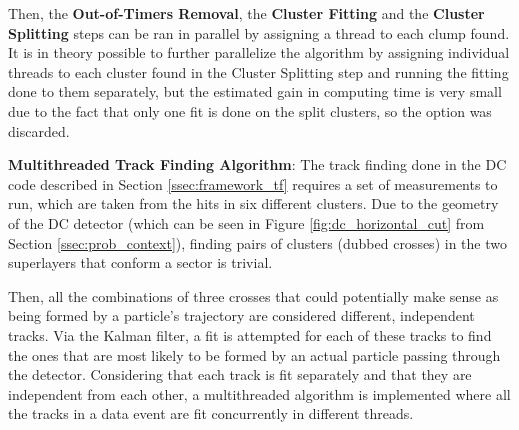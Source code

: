 Then, the \textbf{Out-of-Timers Removal}, the \textbf{Cluster Fitting} and the \textbf{Cluster Splitting} steps can be ran in parallel by assigning a thread to each clump found.
It is in theory possible to further parallelize the algorithm by assigning individual threads to each cluster found in the Cluster Splitting step and running the fitting done to them separately, but the estimated gain in computing time is very small due to the fact that only one fit is done on the split clusters, so the option was discarded.

\textbf{Multithreaded Track Finding Algorithm}: The track finding done in the DC code described in Section \ref{ssec:framework_tf} requires a set of measurements to run, which are taken from the hits in six different clusters.
Due to the geometry of the DC detector (which can be seen in Figure \ref{fig:dc_horizontal_cut} from Section \ref{ssec:prob_context}), finding pairs of clusters (dubbed crosses) in the two superlayers that conform a sector is trivial.

Then, all the combinations of three crosses that could potentially make sense as being formed by a particle's trajectory are considered different, independent tracks.
Via the Kalman filter, a fit is attempted for each of these tracks to find the ones that are most likely to be formed by an actual particle passing through the detector.
Considering that each track is fit separately and that they are independent from each other, a multithreaded algorithm is implemented where all the tracks in a data event are fit concurrently in different threads.